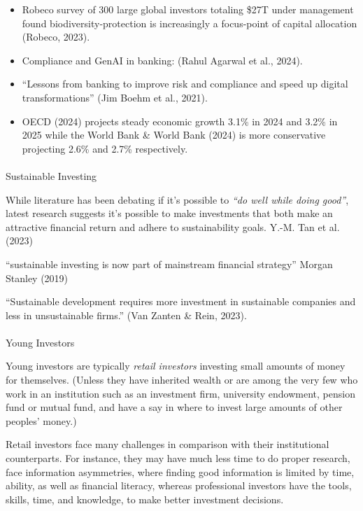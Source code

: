 \documentclass[
  letterpaper,
  DIV=11,
  numbers=noendperiod]{scrartcl}
\makeatletter
\let\oldparagraph\paragraph
\renewcommand{\paragraph}{
    \@ifstar
      \xxxParagraphStar
      \xxxParagraphNoStar
  }
\newcommand{\xxxParagraphStar}[1]{\oldparagraph*{#1}\mbox{}}
\newcommand{\xxxParagraphNoStar}[1]{\oldparagraph{#1}\mbox{}}
\makeatother
\begin{document}
\begin{itemize}
\item
  Robeco survey of 300 large global investors totaling \$27T under
  management found biodiversity-protection is increasingly a focus-point
  of capital allocation (Robeco, 2023).
\item
  Compliance and GenAI in banking: (Rahul Agarwal et al., 2024).
\item
  ``Lessons from banking to improve risk and compliance and speed up
  digital transformations'' (Jim Boehm et al., 2021).
\item
  OECD (2024) projects steady economic growth 3.1\% in 2024 and 3.2\% in
  2025 while the World Bank \& World Bank (2024) is more conservative
  projecting 2.6\% and 2.7\% respectively.
\end{itemize}

\paragraph{Sustainable Investing}\label{sustainable-investing}

While literature has been debating if it's possible to \emph{``do well
while doing good''}, latest research suggests it's possible to make
investments that both make an attractive financial return and adhere to
sustainability goals. Y.-M. Tan et al. (2023)

``sustainable investing is now part of mainstream financial strategy''
Morgan Stanley (2019)

``Sustainable development requires more investment in sustainable
companies and less in unsustainable firms.'' (Van Zanten \& Rein, 2023).

\paragraph{Young Investors}\label{young-investors}

Young investors are typically \emph{retail investors} investing small
amounts of money for themselves. (Unless they have inherited wealth or
are among the very few who work in an institution such as an investment
firm, university endowment, pension fund or mutual fund, and have a say
in where to invest large amounts of other peoples' money.)

Retail investors face many challenges in comparison with their
institutional counterparts. For instance, they may have much less time
to do proper research, face information asymmetries, where finding good
information is limited by time, ability, as well as financial literacy,
whereas professional investors have the tools, skills, time, and
knowledge, to make better investment decisions.
\end{document}
